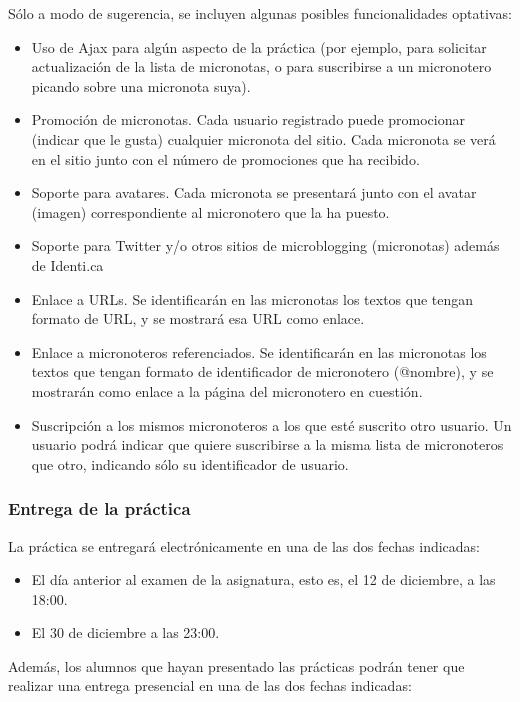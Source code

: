 Sólo a modo de sugerencia, se incluyen algunas posibles funcionalidades optativas:

\begin{itemize}
\item Uso de Ajax para algún aspecto de la práctica (por ejemplo, para solicitar actualización de la lista de micronotas, o para suscribirse a un micronotero picando sobre una micronota suya).
\item Promoción de micronotas. Cada usuario registrado puede promocionar (indicar que le gusta) cualquier micronota del sitio. Cada micronota se verá en el sitio junto con el número de promociones que ha recibido.
\item Soporte para avatares. Cada micronota se presentará junto con el avatar (imagen) correspondiente al micronotero que la ha puesto.
\item Soporte para Twitter y/o otros sitios de microblogging (micronotas) además de Identi.ca
\item Enlace a URLs. Se identificarán en las micronotas los textos que tengan formato de URL, y se mostrará esa URL como enlace.
\item Enlace a micronoteros referenciados. Se identificarán en las micronotas los textos que tengan formato de identificador de micronotero (@nombre), y se mostrarán como enlace a la página del micronotero en cuestión.
\item Suscripción a los mismos micronoteros a los que esté suscrito otro usuario. Un usuario podrá indicar que quiere suscribirse a la misma lista de micronoteros que otro, indicando sólo su identificador de usuario.
\end{itemize}

\subsubsection{Entrega de la práctica}

La práctica se entregará electrónicamente en una de las dos fechas indicadas:

\begin{itemize}
\item El día anterior al examen de la asignatura, esto es, el 12 de diciembre, a las 18:00.
\item El 30 de diciembre a las 23:00.
\end{itemize}

Además, los alumnos que hayan presentado las prácticas podrán tener que realizar una entrega presencial en una de las dos fechas indicadas:

